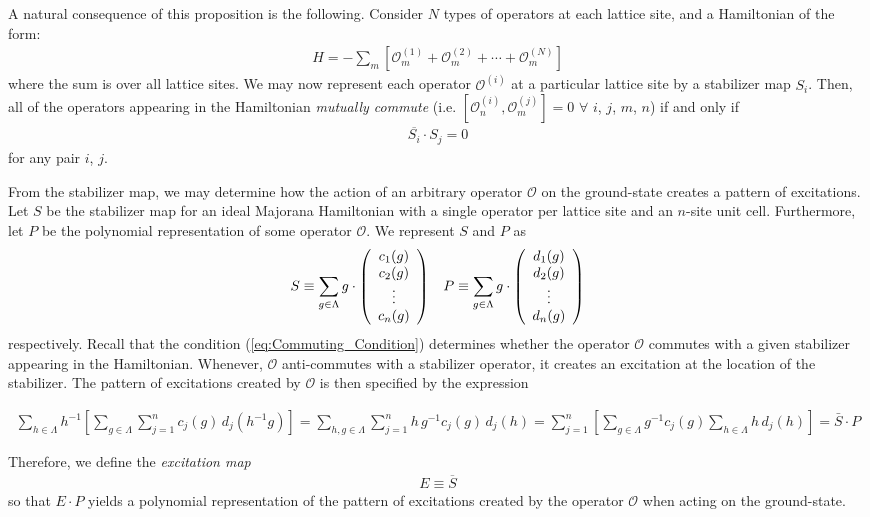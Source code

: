 \documentclass[aps,twocolumn,preprintnumbers,floatfix,showpacs,prx]{revtex4-1}
\begin{document}
A natural consequence of this proposition is the following. Consider $N$ types of operators at each lattice site, and a Hamiltonian of the form:
\begin{align}
H = -\sum_{m}\left[\mathcal{O}^{(1)}_{m} + \mathcal{O}^{(2)}_{m} + \cdots + \mathcal{O}^{(N)}_{m}\right]
\end{align}
where the sum is over all lattice sites. We may now represent each operator $\mathcal{O}^{(i)}$ at a particular lattice site by a stabilizer map $S_{i}$.  Then, all of the operators appearing in the Hamiltonian \emph{mutually commute} (i.e. $[\mathcal{O}^{(i)}_{n}, \mathcal{O}^{(j)}_{m}] = 0$ $\forall$ $i$, $j$, $m$, $n$) if and only if
\begin{align}
\overline{S_{i}}\cdot S_{j} = 0
\end{align}
for any pair $i$, $j$.

From the stabilizer map, we may determine how the action of an arbitrary operator $\mathcal{O}$ on the ground-state creates a pattern of excitations.  Let $S$ be the stabilizer map for an ideal Majorana Hamiltonian with a single operator per lattice site and an $n$-site unit cell. Furthermore, let $P$ be the polynomial representation of some operator $\mathcal{O}$.  We represent $S$ and $P$ as
\begin{align}
S \equiv \sum_{g\in\Lambda}g\cdot\left(\begin{array}{c}
c_{1}(g)\\
c_{2}(g)\\
\vdots\\
c_{n}(g)
\end{array}
\right) \hspace{.12in}
P \equiv \sum_{g\in\Lambda}g\cdot\left(\begin{array}{c}
d_{1}(g)\\
d_{2}(g)\\
\vdots\\
d_{n}(g)
\end{array}
\right)
\end{align}
respectively.  Recall that the condition (\ref{eq:Commuting_Condition}) determines whether the operator $\mathcal{O}$ commutes with a given stabilizer appearing in the Hamiltonian.  Whenever, $\mathcal{O}$ anti-commutes with a stabilizer operator, it creates an excitation at the location of the stabilizer.  The pattern of excitations created by $\mathcal{O}$ is then specified by the expression
\begin{widetext}
\begin{align}
\sum_{h\in\Lambda}h^{-1}\left[\sum_{g\in\Lambda}\sum_{j=1}^{n}c_{j}(g)\,d_{j}(h^{-1}g)\right] = \sum_{h,g\in\Lambda}\sum_{j=1}^{n}h\,g^{-1}c_{j}(g)\,d_{j}(h) = \sum_{j=1}^{n}\left[\sum_{g\in\Lambda}g^{-1}c_{j}(g)\sum_{h\in\Lambda}h\,d_{j}(h)\right] = \bar{S}\cdot P
\end{align}
\end{widetext}
Therefore, we define the \emph{excitation map}
\begin{align}
E \equiv \overline{S}
\end{align}
so that $E\cdot P$ yields a polynomial representation of the pattern of excitations created by the operator $\mathcal{O}$ when acting on the ground-state.
\end{document}
